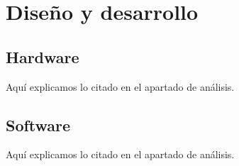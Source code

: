 \section{Diseño y desarrollo}

\subsection{Hardware}
Aquí explicamos lo citado en el apartado de análisis.

\subsection{Software}
Aquí explicamos lo citado en el apartado de análisis.